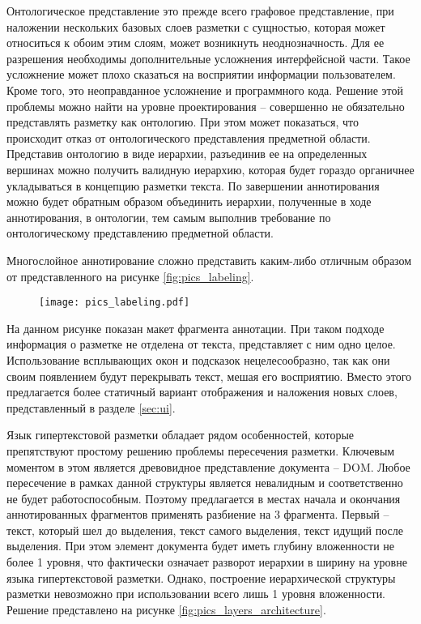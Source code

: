 \documentclass[../main]{subfiles}
\begin{document}
Онтологическое представление это прежде всего графовое представление, при наложении нескольких базовых слоев разметки с сущностью, которая может относиться к обоим этим слоям, может возникнуть неоднозначность. Для ее разрешения необходимы дополнительные усложнения интерфейсной части. Такое усложнение может плохо сказаться на восприятии информации пользователем. Кроме того, это неоправданное усложнение и программного кода. Решение этой проблемы можно найти на уровне проектирования -- совершенно не обязательно представлять разметку как онтологию. При этом может показаться, что происходит отказ от онтологического представления предметной области. Представив онтологию в виде иерархии, разъединив ее на определенных вершинах можно получить валидную иерархию, которая будет гораздо органичнее укладываться в концепцию разметки текста. По завершении аннотирования можно будет обратным образом объединить иерархии, полученные в ходе аннотирования, в онтологии, тем самым выполнив требование по онтологическому представлению предметной области.

Многослойное аннотирование сложно представить каким-либо отличным образом от представленного на рисунке \ref{fig:pics_labeling}. 

\begin{figure}[H]
    \centering
    {\texttt{[image: pics\_labeling.pdf]}}
    \vspace{-\baselineskip}
\end{figure}

На данном рисунке показан макет фрагмента аннотации. При таком подходе информация о разметке не отделена от текста, представляет с ним одно целое. Использование всплывающих окон и подсказок нецелесообразно, так как они своим появлением будут перекрывать текст, мешая его восприятию. Вместо этого предлагается более статичный вариант отображения и наложения новых слоев, представленный в разделе \ref{sec:ui}.

Язык гипертекстовой разметки обладает рядом особенностей, которые препятствуют простому решению проблемы пересечения разметки. Ключевым моментом в этом является древовидное представление документа -- DOM. Любое пересечение в рамках данной структуры является невалидным и соответственно не будет работоспособным. Поэтому предлагается в местах начала и окончания аннотированных фрагментов применять разбиение на 3 фрагмента. Первый -- текст, который шел до выделения, текст самого выделения, текст идущий после выделения. При этом элемент документа будет иметь глубину вложенности не более 1 уровня, что фактически означает разворот иерархии в ширину на уровне языка гипертекстовой разметки. Однако, построение иерархической структуры разметки невозможно при использовании всего лишь 1 уровня вложенности. Решение представлено на рисунке \ref{fig:pics_layers_architecture}.
\end{document}
